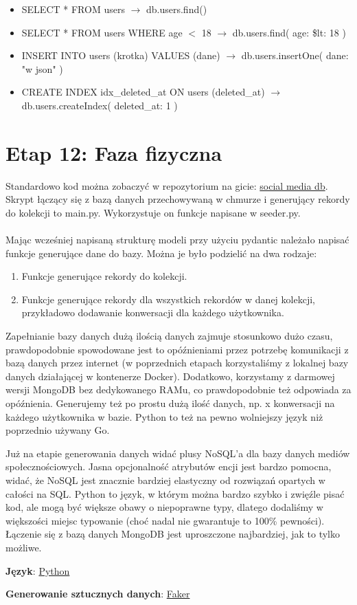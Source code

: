 \documentclass{article}
\begin{document}
\begin{itemize}
    \item SELECT * FROM users $\rightarrow$ db.users.find()
    \item SELECT * FROM users WHERE age $<$ 18 $\rightarrow$ db.users.find({ age: { \$lt: 18 } })
    \item INSERT INTO users (krotka) VALUES (dane) $\rightarrow$ db.users.insertOne({ dane: "w json" })
    \item CREATE INDEX idx\_deleted\_at ON users (deleted\_at) $\rightarrow$ db.users.createIndex({ deleted\_at: 1 })
\end{itemize}

\section{Etap 12: Faza fizyczna }

\quad Standardowo kod można zobaczyć w repozytorium na gicie: \href{https://github.com/lukaszfabia/social_media_db}{social media db}. Skrypt łączący się z bazą danych przechowywaną w chmurze i generujący rekordy do kolekcji to main.py. Wykorzystuje on funkcje napisane w seeder.py.\\\\

\quad Mając wcześniej napisaną strukturę modeli przy użyciu pydantic należało napisać funkcje generujące dane do bazy. Można je było podzielić na dwa rodzaje:

\begin{enumerate}
    \item Funkcje generujące rekordy do kolekcji.
    \item Funkcje generujące rekordy dla wszystkich rekordów w danej kolekcji, przykładowo dodawanie konwersacji dla każdego użytkownika.
\end{enumerate}

Zapełnianie bazy danych dużą ilością danych zajmuje stosunkowo dużo czasu, prawdopodobnie spowodowane jest to opóźnieniami przez potrzebę komunikacji z bazą danych przez internet (w poprzednich etapach korzystaliśmy z lokalnej bazy danych działającej w kontenerze Docker). Dodatkowo, korzystamy z darmowej wersji MongoDB bez dedykowanego RAMu, co prawdopodobnie też odpowiada za opóźnienia. Generujemy też po prostu dużą ilość danych, np. x konwersacji na każdego użytkownika w bazie. Python to też na pewno wolniejszy język niż poprzednio używany Go.

Już na etapie generowania danych widać plusy NoSQL'a dla bazy danych mediów społecznościowych. Jasna opcjonalność atrybutów encji jest bardzo pomocna, widać, że NoSQL jest znacznie bardziej elastyczny od rozwiązań opartych w całości na SQL. Python to język, w którym można bardzo szybko i zwięźle pisać kod, ale mogą być większe obawy o niepoprawne typy, dlatego dodaliśmy w większości miejsc typowanie (choć nadal nie gwarantuje to 100\% pewności). Łączenie się z bazą danych MongoDB jest uproszczone najbardziej, jak to tylko możliwe.

\textbf{Język}: \href{https://www.python.org/}{Python}

\textbf{Generowanie sztucznych danych}: \href{https://faker.readthedocs.io/en/master/}{Faker}




\end{document}
